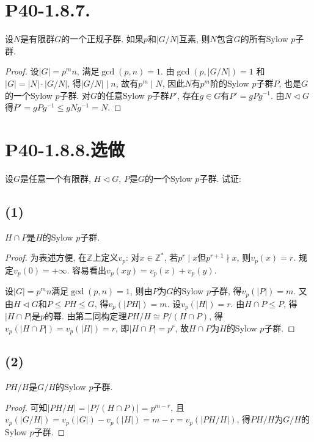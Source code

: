 \documentclass[12pt, a4paper, fontset=windows]{ctexart}
\newcommand{\Z}{\mathbb{Z}}
\newcommand{\abs}[1]{\left|{#1}\right|}
\newcommand{\isom}{\cong} %
\newcommand{\xuan}{{\normalsize 选做}}
\begin{document}
\section*{P40-1.8.7.}

设$N$是有限群$G$的一个正规子群. 如果$p$和$\abs{G/N}$互素, 
则$N$包含$G$的所有Sylow $p$子群. 

\begin{proof}
设$\abs{G}=p^mn$, 满足$\gcd(p,n)=1$. 由$\gcd(p,\abs{G/N})=1$
和$\abs{G}=\abs{N}\cdot\abs{G/N}$, 得$\abs{G/N}\mid n$, 故有$p^m\mid N$, 
因此$N$有$p^m$阶的Sylow $p$子群$P$, 也是$G$的一个Sylow $p$子群. 
对$G$的任意Sylow $p$子群$P'$, 存在$g\in G$有$P'=gPg^{-1}$. 
由$N\lhd G$得$P'=gPg^{-1}\le gNg^{-1}=N$. 
\end{proof}

\section*{P40-1.8.8.\xuan}

设$G$是任意一个有限群, $H\lhd G$, 
$P$是$G$的一个Sylow $p$子群. 试证: 

\subsection*{(1)}

$H\cap P$是$H$的Sylow $p$子群. 

\begin{proof}
为表述方便, 在$\Z$上定义$v_p$: 对$x\in\Z^*$, 若$p^r\mid x$但$p^{r+1}\nmid x$, 则$v_p(x)=r$. 
规定$v_p(0)=+\infty$. 容易看出$v_p(xy)=v_p(x)+v_p(y)$. 

设$\abs{G}=p^mn$满足$\gcd(p,n)=1$, 则由$P$为$G$的Sylow $p$子群, 得$v_p(\abs{P})=m$. 
又由$H\lhd G$和$P\le PH\le G$, 得$v_p(\abs{PH})=m$. 
设$v_p(\abs{H})=r$. 由$H\cap P\le P$, 得$\abs{H\cap P}$是$p$的幂. 
由第二同构定理$PH/H\isom P/(H\cap P)$, 得$v_p(\abs{H\cap P})=v_p(\abs{H})=r$, 
即$\abs{H\cap P}=p^r$, 故$H\cap P$为$H$的Sylow $p$子群. 
\end{proof}

\subsection*{(2)}

$PH/H$是$G/H$的Sylow $p$子群. 

\begin{proof}
可知$\abs{PH/H}=\abs{P/(H\cap P)}=p^{m-r}$, 且
$v_p(\abs{G/H})=v_p(\abs{G})-v_p(\abs{H})=m-r=v_p(\abs{PH/H})$, 
得$PH/H$为$G/H$的Sylow $p$子群. 
\end{proof}
\end{document}
